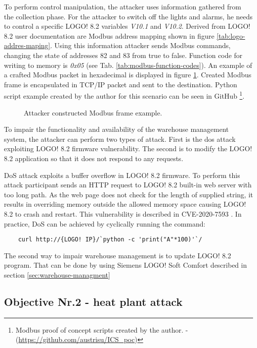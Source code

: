 To perform control manipulation, the attacker uses information gathered from the collection phase. For the attacker to switch off the lights and alarms, he needs to control a specific LOGO! 8.2 variables \textit{V10.1} and \textit{V10.2}. Derived from LOGO! 8.2 user documentation are Modbus address mapping shown in figure \ref{tab:logo-addres-maping}. Using this information attacker sends Modbus commands, changing the state of addresses 82 and 83 from true to false. Function code for writing to memory is \textit{0x05} (see Tab. \ref{tab:modbus-function-codes}). An example of a crafted Modbus packet in hexadecimal is displayed in figure \ref{fig:Modbus-attack}. Created Modbus frame is encapsulated in TCP/IP packet and sent to the destination. Python script example created by the author for this scenario can be seen in GitHub \footnote{Modbus proof of concept scripts created by the author. - (\url{https://github.com/austrisu/ICS_poc})}.

\begin{figure}
	\caption{Attacker constructed Modbus frame example.}
	\label{fig:Modbus-attack}
\end{figure}

To impair the functionality and availability of the warehouse management system, the attacker can perform two types of attack. First is the \gls*{dos} attack exploiting LOGO! 8.2 firmware vulnerability. The second is to modify the LOGO! 8.2 application so that it does not respond to any requests. 

DoS attack exploits a buffer overflow in LOGO! 8.2 firmware. To perform this attack participant sends an HTTP request to LOGO! 8.2 built-in web server with too long path. As the web page does not check for the length of supplied string, it results in overriding memory outside the allowed memory space causing LOGO! 8.2 to crash and restart. This vulnerability is described in CVE-2020-7593 \parencite{WEB-11-logo-buffer-overflow}. In practice, DoS can be achieved by cyclically running the command:

\begin{verbatim}
	curl http://{LOGO! IP}/`python -c 'print("A"*100)'`/
\end{verbatim} 

The second way to impair warehouse management is to update LOGO! 8.2 program. That can be done by using Siemens LOGO! Soft Comfort described in section \ref{sec:warehouse-managment}

\subsection{Objective Nr.2 - heat plant attack}

